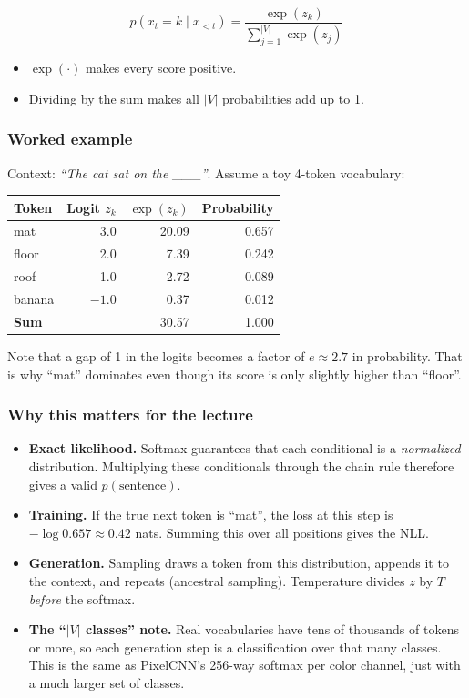 $$p(x_t = k \mid x_{<t}) = \frac{\exp(z_k)}{\sum_{j=1}^{|V|} \exp(z_j)}$$

\begin{itemize}
  \item $\exp(\cdot)$ makes every score positive.
  \item Dividing by the sum makes all $|V|$ probabilities add up to 1.
\end{itemize}

\subsubsection*{Worked example}

Context: \textit{``The cat sat on the \_\_\_''}. Assume a toy 4-token vocabulary:

\begin{center}
\begin{tabular}{lrrr}
\toprule
Token & Logit $z_k$ & $\exp(z_k)$ & Probability \\
\midrule
mat    & 3.0  & 20.09 & 0.657 \\
floor  & 2.0  & 7.39  & 0.242 \\
roof   & 1.0  & 2.72  & 0.089 \\
banana & $-1.0$ & 0.37 & 0.012 \\
\midrule
\textbf{Sum} & & 30.57 & 1.000 \\
\bottomrule
\end{tabular}
\end{center}

Note that a gap of 1 in the logits becomes a factor of $e \approx 2.7$ in probability. That is why ``mat'' dominates even though its score is only slightly higher than ``floor''.

\subsubsection*{Why this matters for the lecture}

\begin{itemize}
  \item \textbf{Exact likelihood.} Softmax guarantees that each conditional is a \textit{normalized} distribution. Multiplying these conditionals through the chain rule therefore gives a valid $p(\text{sentence})$.
  \item \textbf{Training.} If the true next token is ``mat'', the loss at this step is $-\log 0.657 \approx 0.42$ nats. Summing this over all positions gives the NLL.
  \item \textbf{Generation.} Sampling draws a token from this distribution, appends it to the context, and repeats (ancestral sampling). Temperature divides $z$ by $T$ \textit{before} the softmax.
  \item \textbf{The ``$|V|$ classes'' note.} Real vocabularies have tens of thousands of tokens or more, so each generation step is a classification over that many classes. This is the same as PixelCNN's 256-way softmax per color channel, just with a much larger set of classes.
\end{itemize}

